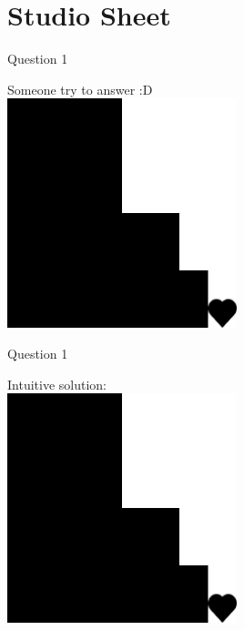 \documentclass[10pt]{beamer}
\begin{document}
\section[Studio Sheet (and Photo Taking)]{Studio Sheet}
\begin{frame}[fragile]{Question 1}
\begin{center}
Someone try to answer :D \\
\vspace{1em}
\includegraphics[width = 0.5\textwidth]{img/q2.png}
\end{center}
\end{frame}

\begin{frame}[fragile]{Question 1}
\begin{center}
Intuitive solution: \\
\vspace{1em}
\includegraphics[width = 0.5\textwidth]{img/q2.png}
\end{center}
\end{frame}
\end{document}
